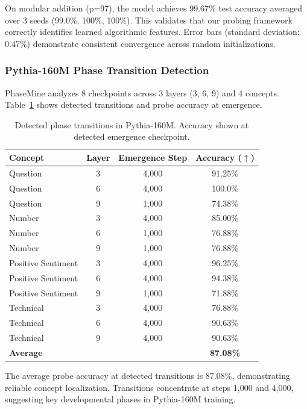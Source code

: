 \documentclass{article}
\begin{document}
On modular addition (p=97), the model achieves 99.67\% test accuracy averaged over 3 seeds (99.0\%, 100\%, 100\%). This validates that our probing framework correctly identifies learned algorithmic features. Error bars (standard deviation: 0.47\%) demonstrate consistent convergence across random initializations.

\subsubsection{Pythia-160M Phase Transition Detection}

PhaseMine analyzes 8 checkpoints across 3 layers (3, 6, 9) and 4 concepts. Table~\ref{tab:transitions} shows detected transitions and probe accuracy at emergence.

\begin{table}[t]
\caption{Detected phase transitions in Pythia-160M. Accuracy shown at detected emergence checkpoint.}
\label{tab:transitions}
\centering
\begin{tabular}{@{}lccc@{}}
\toprule
Concept & Layer & Emergence Step & Accuracy ($\uparrow$) \\
\midrule
Question & 3 & 4,000 & 91.25\% \\
Question & 6 & 4,000 & 100.0\% \\
Question & 9 & 1,000 & 74.38\% \\
Number & 3 & 4,000 & 85.00\% \\
Number & 6 & 1,000 & 76.88\% \\
Number & 9 & 1,000 & 76.88\% \\
Positive Sentiment & 3 & 4,000 & 96.25\% \\
Positive Sentiment & 6 & 4,000 & 94.38\% \\
Positive Sentiment & 9 & 1,000 & 71.88\% \\
Technical & 3 & 4,000 & 76.88\% \\
Technical & 6 & 4,000 & 90.63\% \\
Technical & 9 & 4,000 & 90.63\% \\
\midrule
\multicolumn{3}{l}{\textbf{Average}} & \textbf{87.08\%} \\
\bottomrule
\end{tabular}
\end{table}

The average probe accuracy at detected transitions is 87.08\%, demonstrating reliable concept localization. Transitions concentrate at steps 1,000 and 4,000, suggesting key developmental phases in Pythia-160M training.
\end{document}

